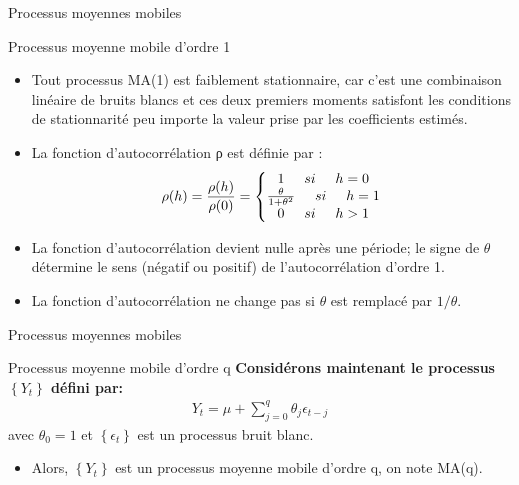 \documentclass{beamer}
\begin{document}
\begin{frame}{Processus moyennes mobiles}
\begin{block}{Processus moyenne mobile d’ordre 1}
\begin{itemize}
\item Tout processus MA(1) est faiblement stationnaire, car c’est une combinaison linéaire de bruits blancs et ces deux premiers moments satisfont les conditions de stationnarité peu importe la valeur prise par les coefficients estimés.
\item La fonction d’autocorrélation ρ est définie par :
\begin{align*}
\rho(h)=\frac{\rho(h)}{\rho(0)}=\left\{\begin{matrix}
1 \hspace{0.5cm} si \hspace{0.5cm} h=0  \\ 
\frac{\theta}{1+\theta^2} \hspace{0.5cm} si \hspace{0.5cm} h=1  \\ 
0  \hspace{0.5cm} si \hspace{0.5cm} h>1  
\end{matrix}\right.
\end{align*}
\item La fonction d’autocorrélation devient nulle après une période; le signe de $\theta$ détermine le sens (négatif ou positif) de l’autocorrélation d’ordre 1.
\item La fonction d’autocorrélation ne change pas si $\theta$ est remplacé par $1/\theta$.
\end{itemize}
\end{block}
\end{frame}

\begin{frame}{Processus moyennes mobiles}
\begin{block}{Processus moyenne mobile d’ordre q}
\textbf{Considérons maintenant le processus $\left\{Y_t \right\}$ défini par:}
\begin{align*}
Y_t=\mu+\sum_{j=0}^q \theta_j \epsilon_{t-j}
\end{align*}
avec $\theta_0=1$ et $\left\{ \epsilon_t \right\}$ est un processus bruit blanc.
\begin{itemize}
\item Alors, $\left\{Y_t \right\}$ est un processus moyenne mobile d’ordre q, on note MA(q).
\end{itemize}
\end{block}
\end{frame}
\end{document}
